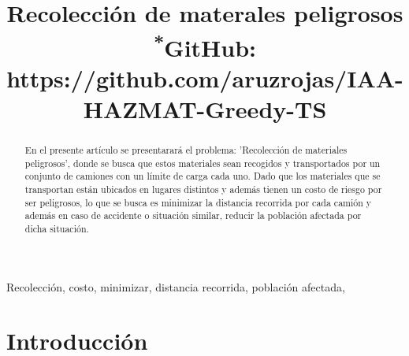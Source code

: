 \documentclass[conference]{IEEEtran}
\begin{document}
\title{Recolecci\'on de materales peligrosos\\
{\footnotesize \textsuperscript{*}GitHub: https://github.com/aruzrojas/IAA-HAZMAT-Greedy-TS}
}

\author{

}

\maketitle

\begin{abstract}

En el presente art\'iculo se presentarar\'a el problema: 'Recolecci\'on de materiales peligrosos', donde se busca que estos materiales sean recogidos y transportados por un conjunto de camiones con un límite de carga cada uno. Dado que los materiales que se transportan est\'an ubicados en lugares distintos y adem\'as tienen un costo de riesgo por ser peligrosos, lo que se busca es minimizar la distancia recorrida por cada camión y además en caso de accidente o situación similar, reducir la población afectada por dicha situación.

\end{abstract}

\begin{IEEEkeywords}
Recolecci\'on, costo, minimizar, distancia recorrida, poblaci\'on afectada,
\end{IEEEkeywords}

\section{Introducci\'on}
\end{document}
